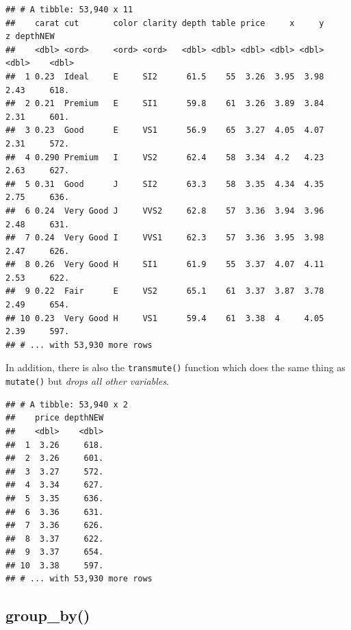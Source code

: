 \documentclass[
]{book}
\newenvironment{Shaded}{\begin{snugshade}}{\end{snugshade}}
\newcommand{\DataTypeTok}[1]{\textcolor[rgb]{0.13,0.29,0.53}{#1}}
\newcommand{\DecValTok}[1]{\textcolor[rgb]{0.00,0.00,0.81}{#1}}
\newcommand{\KeywordTok}[1]{\textcolor[rgb]{0.13,0.29,0.53}{\textbf{#1}}}
\newcommand{\NormalTok}[1]{#1}
\newcommand{\OperatorTok}[1]{\textcolor[rgb]{0.81,0.36,0.00}{\textbf{#1}}}
\newcommand{\StringTok}[1]{\textcolor[rgb]{0.31,0.60,0.02}{#1}}
\begin{document}
\begin{verbatim}
## # A tibble: 53,940 x 11
##    carat cut       color clarity depth table price     x     y     z depthNEW
##    <dbl> <ord>     <ord> <ord>   <dbl> <dbl> <dbl> <dbl> <dbl> <dbl>    <dbl>
##  1 0.23  Ideal     E     SI2      61.5    55  3.26  3.95  3.98  2.43     618.
##  2 0.21  Premium   E     SI1      59.8    61  3.26  3.89  3.84  2.31     601.
##  3 0.23  Good      E     VS1      56.9    65  3.27  4.05  4.07  2.31     572.
##  4 0.290 Premium   I     VS2      62.4    58  3.34  4.2   4.23  2.63     627.
##  5 0.31  Good      J     SI2      63.3    58  3.35  4.34  4.35  2.75     636.
##  6 0.24  Very Good J     VVS2     62.8    57  3.36  3.94  3.96  2.48     631.
##  7 0.24  Very Good I     VVS1     62.3    57  3.36  3.95  3.98  2.47     626.
##  8 0.26  Very Good H     SI1      61.9    55  3.37  4.07  4.11  2.53     622.
##  9 0.22  Fair      E     VS2      65.1    61  3.37  3.87  3.78  2.49     654.
## 10 0.23  Very Good H     VS1      59.4    61  3.38  4     4.05  2.39     597.
## # ... with 53,930 more rows
\end{verbatim}

In addition, there is also the \texttt{transmute()} function which does the same thing as \texttt{mutate()} but \emph{drops all other variables}.

\begin{Shaded}
\end{Shaded}

\begin{verbatim}
## # A tibble: 53,940 x 2
##    price depthNEW
##    <dbl>    <dbl>
##  1  3.26     618.
##  2  3.26     601.
##  3  3.27     572.
##  4  3.34     627.
##  5  3.35     636.
##  6  3.36     631.
##  7  3.36     626.
##  8  3.37     622.
##  9  3.37     654.
## 10  3.38     597.
## # ... with 53,930 more rows
\end{verbatim}

\hypertarget{group_by}{%
\subsection{group\_by()}\label{group_by}}
\end{document}
